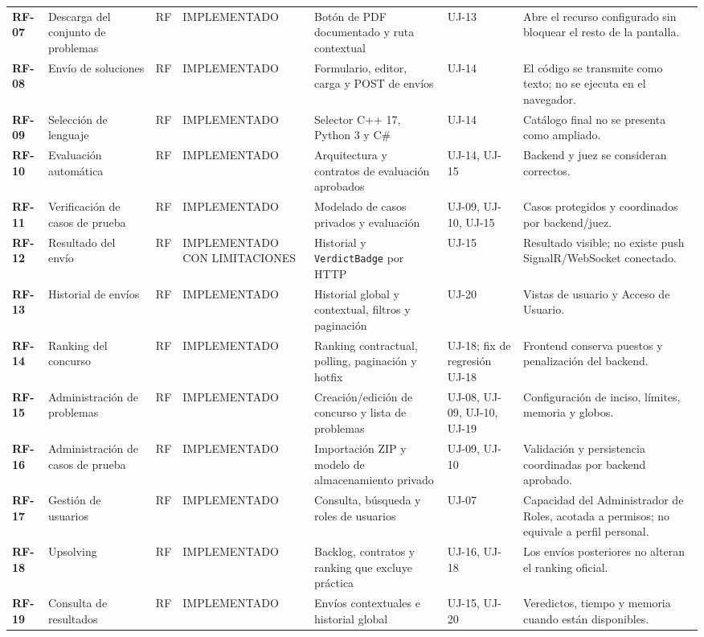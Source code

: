\documentclass[11pt,a4paper]{article}
\begin{document}
\begin{landscape}
\begin{longtable}{>{\bfseries}p{1.25cm}p{4.0cm}p{1.15cm}p{3.35cm}p{4.5cm}p{4.0cm}p{5.1cm}}
RF-07 & Descarga del conjunto de problemas & RF & IMPLEMENTADO & Botón de PDF documentado y ruta contextual & UJ-13 & Abre el recurso configurado sin bloquear el resto de la pantalla. \\
RF-08 & Envío de soluciones & RF & IMPLEMENTADO & Formulario, editor, carga y POST de envíos & UJ-14 & El código se transmite como texto; no se ejecuta en el navegador. \\
RF-09 & Selección de lenguaje & RF & IMPLEMENTADO & Selector C++ 17, Python 3 y C\# & UJ-14 & Catálogo final no se presenta como ampliado. \\
RF-10 & Evaluación automática & RF & IMPLEMENTADO & Arquitectura y contratos de evaluación aprobados & UJ-14, UJ-15 & Backend y juez se consideran correctos. \\
RF-11 & Verificación de casos de prueba & RF & IMPLEMENTADO & Modelado de casos privados y evaluación & UJ-09, UJ-10, UJ-15 & Casos protegidos y coordinados por backend/juez. \\
RF-12 & Resultado del envío & RF & IMPLEMENTADO CON LIMITACIONES & Historial y \texttt{VerdictBadge} por HTTP & UJ-15 & Resultado visible; no existe push SignalR/WebSocket conectado. \\
RF-13 & Historial de envíos & RF & IMPLEMENTADO & Historial global y contextual, filtros y paginación & UJ-20 & Vistas de usuario y Acceso de Usuario. \\
RF-14 & Ranking del concurso & RF & IMPLEMENTADO & Ranking contractual, polling, paginación y hotfix & UJ-18; fix de regresión UJ-18 & Frontend conserva puestos y penalización del backend. \\
RF-15 & Administración de problemas & RF & IMPLEMENTADO & Creación/edición de concurso y lista de problemas & UJ-08, UJ-09, UJ-10, UJ-19 & Configuración de inciso, límites, memoria y globos. \\
RF-16 & Administración de casos de prueba & RF & IMPLEMENTADO & Importación ZIP y modelo de almacenamiento privado & UJ-09, UJ-10 & Validación y persistencia coordinadas por backend aprobado. \\
RF-17 & Gestión de usuarios & RF & IMPLEMENTADO & Consulta, búsqueda y roles de usuarios & UJ-07 & Capacidad del Administrador de Roles, acotada a permisos; no equivale a perfil personal. \\
RF-18 & Upsolving & RF & IMPLEMENTADO & Backlog, contratos y ranking que excluye práctica & UJ-16, UJ-18 & Los envíos posteriores no alteran el ranking oficial. \\
RF-19 & Consulta de resultados & RF & IMPLEMENTADO & Envíos contextuales e historial global & UJ-15, UJ-20 & Veredictos, tiempo y memoria cuando están disponibles. \\

\end{longtable}
\end{landscape}
\end{document}

